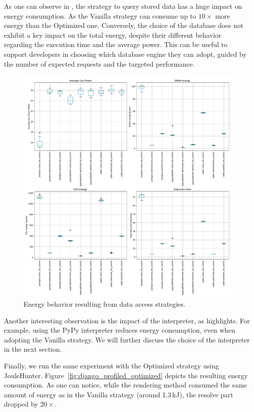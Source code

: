 As one can observe in , the strategy to query stored data has a huge impact on energy consumption.
As the \textsf{Vanilla} strategy can consume up to $10\times$ more energy than the \textsf{Optimized} one.
Conversely, the choice of the database does not exhibit a key impact on the total energy, despite their different behavior regarding the execution time and the average power.
This can be useful to support developers in choosing which database engine they can adopt, guided by the number of expected requests and the targeted performance.

\begin{figure}[!hbt]
    \centering
    \includegraphics[width=\linewidth]{imgs/django}
    \caption{Energy behavior resulting from data access strategies.}
    \label{fig:django}
\end{figure}

Another interesting observation is the impact of the interpreter, as  highlights.
For example, using the \textsf{PyPy} interpreter reduces energy consumption, even when adopting the \textsf{Vanilla} strategy. We will further discuss the choice of the interpreter in the next section.

Finally, we run the same experiment with the \textsf{Optimized} strategy using JouleHunter.
Figure~\ref{fig:django_profiled_optimized} depicts the resulting energy consumption.
As one can notice, while the rendering method consumed the same amount of energy as in the \textsf{Vanilla} strategy (around 1.3\,kJ), the resolve part dropped by $20\times$.
